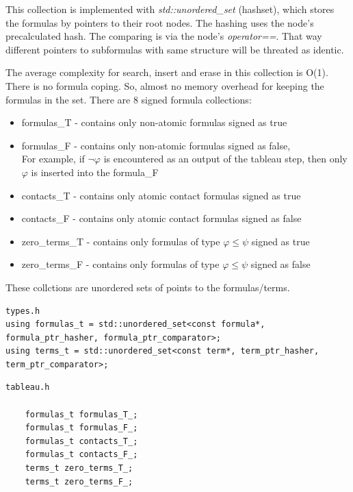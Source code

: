 \documentclass{article}
\begin{document}
	This collection is implemented with \textit{std::unordered\_set} (hashset), which stores the formulas by pointers to their root nodes. The hashing uses the node's precalculated hash. The comparing is via the node's \textit{operator==}. That way different pointers to subformulas with same structure will be threated as identic.

	The average complexity for search, insert and erase in this collection is O(1). There is no formula coping. So, almost no memory overhead for keeping the formulas in the set.
	\newline
	\newline
	There are 8 signed formula collections:
	\begin{itemize}
		\item formulas\_T - contains only non-atomic formulas signed as true
		\item formulas\_F - contains only non-atomic formulas signed as false, \\
				For example, if $\neg\varphi$ is encountered as an output of the tableau step, then only $\varphi$ is inserted into the formula\_F
		\item contacts\_T - contains only atomic contact formulas signed as true
		\item contacts\_F - contains only atomic contact formulas signed as false
		\item zero\_terms\_T - contains only formulas of type $\varphi \le \psi$ signed as true
		\item zero\_terms\_F - contains only formulas of type $\varphi \le \psi$ signed as false
	\end{itemize}

	These collctions are unordered sets of points to the formulas/terms.

\begin{lstlisting}
types.h
using formulas_t = std::unordered_set<const formula*, formula_ptr_hasher, formula_ptr_comparator>;
using terms_t = std::unordered_set<const term*, term_ptr_hasher, term_ptr_comparator>;
\end{lstlisting}

\begin{lstlisting}
tableau.h

    formulas_t formulas_T_;
    formulas_t formulas_F_;
    formulas_t contacts_T_;
    formulas_t contacts_F_;
    terms_t zero_terms_T_;
    terms_t zero_terms_F_;
\end{lstlisting}
\end{document}
